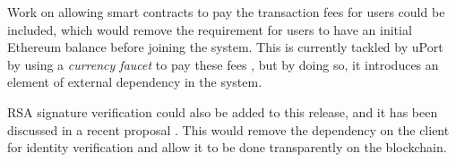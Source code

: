Work on allowing smart contracts to pay the transaction fees for users could be included, which would remove the requirement for users to have an initial Ethereum balance before joining the system. This is currently tackled by uPort by using a \textit{currency faucet} to pay these fees \cite{noauthor_does_nodate}, but by doing so, it introduces an element of external dependency in the system.

RSA signature verification could also be added to this release, and it has been discussed in a recent proposal \cite{noauthor_eip0074_nodate}. This would remove the dependency on the client for identity verification and allow it to be done transparently on the blockchain.